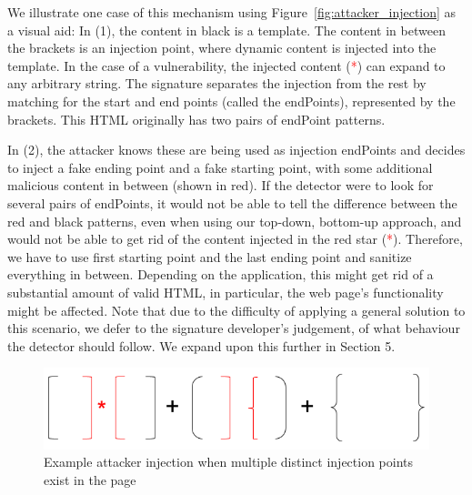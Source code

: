We illustrate one case of this mechanism using Figure~\ref{fig:attacker_injection} as a visual aid: In (1), the content in black is a template. The content in between the brackets is an injection point, where dynamic content is injected into the template. In the case of a vulnerability, the injected content (\textcolor{red}{*}) can expand to any arbitrary string. The signature separates the injection from the rest by matching for the start and end points (called the endPoints), represented by the brackets. This HTML originally has two pairs of endPoint patterns.

In (2), the attacker knows these are being used as injection endPoints and decides to inject a fake ending point and a fake starting point, with some additional malicious content in between (shown in red). If the detector were to look for several pairs of endPoints, it would not be able to tell the difference between the red and black patterns, even when using our top-down, bottom-up approach, and would not be able to get rid of the content injected in the red star (\textcolor{red}{*}). Therefore, we have to use first starting point and the last ending point and sanitize everything in between. Depending on the application, this might get rid of a substantial amount of valid HTML, in particular, the web page's functionality might be affected. Note that due to the difficulty of applying a general solution to this scenario, we defer to the signature developer's judgement, of what behaviour the detector should follow. We expand upon this further in Section 5.


\begin{figure}[h]
	\includegraphics[scale=0.4]{img/attacker_injection_unique.png}
	\caption{Example attacker injection when multiple distinct injection points exist in the page}
	\label{fig:attacker_injection_unqiue}
\end{figure}


